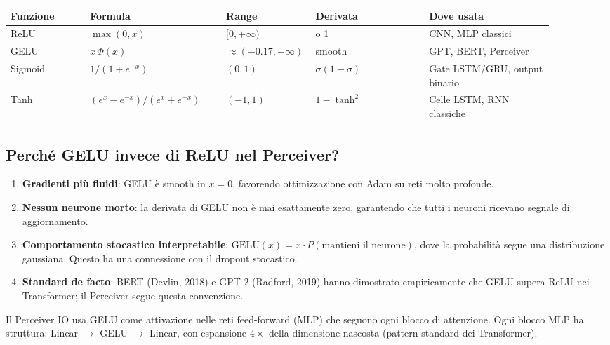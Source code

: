 \documentclass[
  11pt,
]{article}
\newcounter{none} %
\begin{document}
{\def\LTcaptype{none}
\begin{longtable}{@{}
  >{\raggedright\arraybackslash}p{0.14\linewidth}
  >{\raggedright\arraybackslash}p{0.24\linewidth}
  >{\centering\arraybackslash}p{0.10\linewidth}
  >{\raggedright\arraybackslash}p{0.20\linewidth}
  >{\raggedright\arraybackslash}p{0.22\linewidth}@{}}
\toprule
\textbf{Funzione} & \textbf{Formula} & \textbf{Range} & \textbf{Derivata} & \textbf{Dove usata} \\
\midrule\endhead
\bottomrule\endlastfoot
ReLU & $\max(0,x)$ & $[0, +\infty)$ & 0 o 1 & CNN, MLP classici \\
GELU & $x\,\Phi(x)$ & $\approx(-0.17, +\infty)$ & smooth & GPT, BERT, Perceiver \\
Sigmoid & $1/(1+e^{-x})$ & $(0,1)$ & $\sigma(1-\sigma)$ & Gate LSTM/GRU, output binario \\
Tanh & $(e^x-e^{-x})/(e^x+e^{-x})$ & $(-1,1)$ & $1-\tanh^2$ & Celle LSTM, RNN classiche \\
\end{longtable}
}

\subsection{Perché GELU invece di ReLU nel Perceiver?}

\begin{notabox}[title={\textbf{GELU vs ReLU nelle architetture basate su attenzione}}]
\begin{enumerate}
  \item \textbf{Gradienti più fluidi}: GELU è smooth in $x=0$, favorendo ottimizzazione con Adam su reti molto profonde.
  \item \textbf{Nessun neurone morto}: la derivata di GELU non è mai esattamente zero, garantendo che tutti i neuroni ricevano segnale di aggiornamento.
  \item \textbf{Comportamento stocastico interpretabile}: $\text{GELU}(x) = x \cdot P(\text{mantieni il neurone})$, dove la probabilità segue una distribuzione gaussiana. Questo ha una connessione con il dropout stocastico.
  \item \textbf{Standard de facto}: BERT (Devlin, 2018) e GPT-2 (Radford, 2019) hanno dimostrato empiricamente che GELU supera ReLU nei Transformer; il Perceiver segue questa convenzione.
\end{enumerate}
\end{notabox}

\begin{notabox}[title={\textbf{Collegamento al Perceiver}}]
Il Perceiver IO usa GELU come attivazione nelle reti feed-forward (MLP) che seguono ogni blocco di attenzione. Ogni blocco MLP ha struttura: Linear $\to$ GELU $\to$ Linear, con espansione $4\times$ della dimensione nascosta (pattern standard dei Transformer).
\end{notabox}
\end{document}
